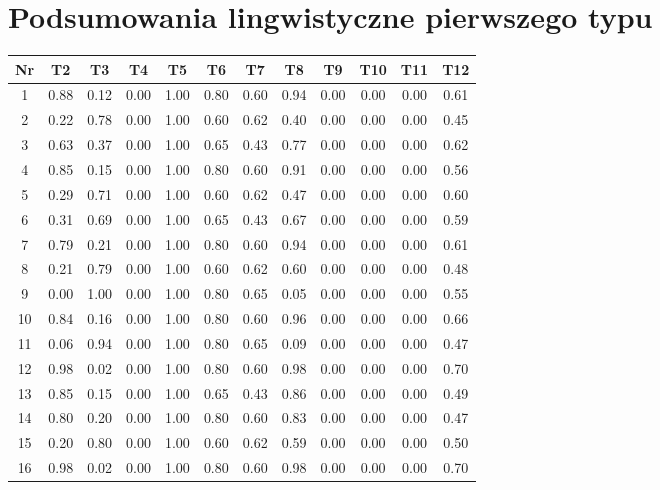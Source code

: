 \documentclass{article}
\begin{document}
\section{Podsumowania lingwistyczne pierwszego typu}
    \begin{table}[h!]
    \centering
    \begin{tabular}{|c|c|c|c|c|c|c|c|c|c|c|c|}
    \hline
    Nr & T2 & T3 & T4 & T5 & T6 & T7 & T8 & T9 & T10 & T11 & T12 \\
    \hline
    1 & 0.88 & 0.12 & 0.00 & 1.00 & 0.80 & 0.60 & 0.94 & 0.00 & 0.00 & 0.00 & 0.61 \\
    \hline
    2 & 0.22 & 0.78 & 0.00 & 1.00 & 0.60 & 0.62 & 0.40 & 0.00 & 0.00 & 0.00 & 0.45 \\
    \hline
    3 & 0.63 & 0.37 & 0.00 & 1.00 & 0.65 & 0.43 & 0.77 & 0.00 & 0.00 & 0.00 & 0.62 \\
    \hline
    4 & 0.85 & 0.15 & 0.00 & 1.00 & 0.80 & 0.60 & 0.91 & 0.00 & 0.00 & 0.00 & 0.56 \\
    \hline
    5 & 0.29 & 0.71 & 0.00 & 1.00 & 0.60 & 0.62 & 0.47 & 0.00 & 0.00 & 0.00 & 0.60 \\
    \hline
    6 & 0.31 & 0.69 & 0.00 & 1.00 & 0.65 & 0.43 & 0.67 & 0.00 & 0.00 & 0.00 & 0.59 \\
    \hline
    7 & 0.79 & 0.21 & 0.00 & 1.00 & 0.80 & 0.60 & 0.94 & 0.00 & 0.00 & 0.00 & 0.61 \\
    \hline
    8 & 0.21 & 0.79 & 0.00 & 1.00 & 0.60 & 0.62 & 0.60 & 0.00 & 0.00 & 0.00 & 0.48 \\
    \hline
    9 & 0.00 & 1.00 & 0.00 & 1.00 & 0.80 & 0.65 & 0.05 & 0.00 & 0.00 & 0.00 & 0.55 \\
    \hline
    10 & 0.84 & 0.16 & 0.00 & 1.00 & 0.80 & 0.60 & 0.96 & 0.00 & 0.00 & 0.00 & 0.66 \\
    \hline
    11 & 0.06 & 0.94 & 0.00 & 1.00 & 0.80 & 0.65 & 0.09 & 0.00 & 0.00 & 0.00 & 0.47 \\
    \hline
    12 & 0.98 & 0.02 & 0.00 & 1.00 & 0.80 & 0.60 & 0.98 & 0.00 & 0.00 & 0.00 & 0.70 \\
    \hline
    13 & 0.85 & 0.15 & 0.00 & 1.00 & 0.65 & 0.43 & 0.86 & 0.00 & 0.00 & 0.00 & 0.49 \\
    \hline
    14 & 0.80 & 0.20 & 0.00 & 1.00 & 0.80 & 0.60 & 0.83 & 0.00 & 0.00 & 0.00 & 0.47 \\
    \hline
    15 & 0.20 & 0.80 & 0.00 & 1.00 & 0.60 & 0.62 & 0.59 & 0.00 & 0.00 & 0.00 & 0.50 \\
    \hline
    16 & 0.98 & 0.02 & 0.00 & 1.00 & 0.80 & 0.60 & 0.98 & 0.00 & 0.00 & 0.00 & 0.70 \\

\end{tabular}
\end{table}
\end{document}
